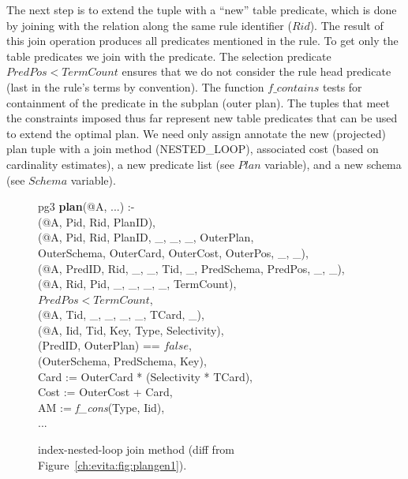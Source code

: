 The next step is to extend the  tuple with a ``new'' table predicate,
which is done by joining with the  relation along the same rule
identifier ($Rid$).  The result of this join operation produces all predicates
mentioned in the rule.  To get only the table predicates we join with the
 predicate.  The selection predicate $PredPos < TermCount$ ensures that
we do not consider the rule head predicate (last in the rule's terms by
convention).  The function $f\_contains$ tests for containment of the predicate
in the subplan (outer plan).  The tuples that meet the constraints imposed thus
far represent new table predicates that can be used to extend the optimal plan.
We need only assign annotate the new (projected) plan tuple with a join method
(NESTED\_LOOP), associated cost (based on cardinality estimates), a new
predicate list (see $Plan$ variable), and a new schema (see $Schema$ variable).

\begin{figure*}
\ssp
\centering
\begin{boxedminipage}{\linewidth}
pg3 {\bf plan}(@A, ...) :-\\
(@A, Pid, Rid, PlanID),\\
(@A, Pid, Rid, PlanID, \_, \_, \_, OuterPlan, \\
\datalogspace \datalogspace OuterSchema, OuterCard, OuterCost, OuterPos, \_, \_),  \\   
(@A, PredID, Rid, \_, \_, Tid, \_, PredSchema, PredPos, \_, \_),\\
(@A, Rid, Pid, \_, \_, \_, \_, TermCount), \\
\datalogspace $PredPos < TermCount$,\\
(@A, Tid, \_, \_, \_, \_, TCard, \_),\\
(@A, Iid, Tid, Key, Type, Selectivity),\\
(PredID, OuterPlan) == $false$,\\
(OuterSchema, PredSchema, Key),\\
\datalogspace Card   := OuterCard * (Selectivity * TCard),\\
\datalogspace Cost   := OuterCost + Card,\\
\datalogspace AM := {\em f\_cons}(Type, Iid),\\
\datalogspace ...
\end{boxedminipage}
\caption{\label{ch:evita:fig:plangen2}index-nested-loop join method (diff from Figure~\ref{ch:evita:fig:plangen1}).}
\end{figure*}

